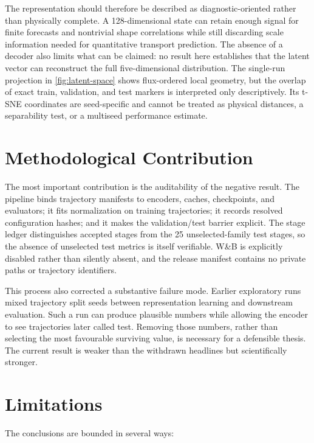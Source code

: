 The representation should therefore be described as diagnostic-oriented rather than physically
complete. A 128-dimensional state can retain enough signal for finite forecasts and nontrivial
shape correlations while still discarding scale information needed for quantitative transport
prediction. The absence of a decoder also limits what can be claimed: no result here establishes
that the latent vector can reconstruct the full five-dimensional distribution. The single-run
projection in \autoref{fig:latent-space} shows flux-ordered local geometry, but the overlap of exact
train, validation, and test markers is interpreted only descriptively. Its t-SNE coordinates are
seed-specific and cannot be treated as physical distances, a separability test, or a multiseed
performance estimate.

\section{Methodological Contribution}

The most important contribution is the auditability of the negative result. The pipeline binds
trajectory manifests to encoders, caches, checkpoints, and evaluators; it fits normalization on
training trajectories; it records resolved configuration hashes; and it makes the validation/test
barrier explicit. The stage ledger distinguishes accepted stages from the 25 unselected-family
test stages, so the absence of unselected test metrics is itself verifiable. W\&B is explicitly
disabled rather than silently absent, and the release manifest contains no private paths or
trajectory identifiers.

This process also corrected a substantive failure mode. Earlier exploratory runs mixed trajectory
split seeds between representation learning and downstream evaluation. Such a run can produce
plausible numbers while allowing the encoder to see trajectories later called test. Removing those
numbers, rather than selecting the most favourable surviving value, is necessary for a defensible
thesis. The current result is weaker than the withdrawn headlines but scientifically stronger.

\section{Limitations}

The conclusions are bounded in several ways:

